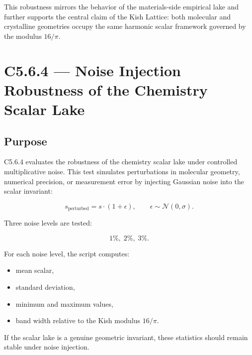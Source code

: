 \documentclass[11pt, letterpaper, openany]{book}
\begin{document}
This robustness mirrors the behavior of the materials‑side empirical lake and
further supports the central claim of the Kish Lattice: both molecular and
crystalline geometries occupy the same harmonic scalar framework governed by the
modulus \(16/\pi\).


\section{C5.6.4 — Noise Injection Robustness of the Chemistry Scalar Lake}

\subsection*{Purpose}
C5.6.4 evaluates the robustness of the chemistry scalar lake under controlled
multiplicative noise. This test simulates perturbations in molecular geometry,
numerical precision, or measurement error by injecting Gaussian noise into the
scalar invariant:



\[
s_{\text{perturbed}} = s \cdot (1 + \epsilon), \qquad
\epsilon \sim \mathcal{N}(0, \sigma).
\]



Three noise levels are tested:



\[
1\%,\; 2\%,\; 3\%.
\]



For each noise level, the script computes:

\begin{itemize}
    \item mean scalar,
    \item standard deviation,
    \item minimum and maximum values,
    \item band width relative to the Kish modulus \(16/\pi\).
\end{itemize}

If the scalar lake is a genuine geometric invariant, these statistics should
remain stable under noise injection.
\end{document}
